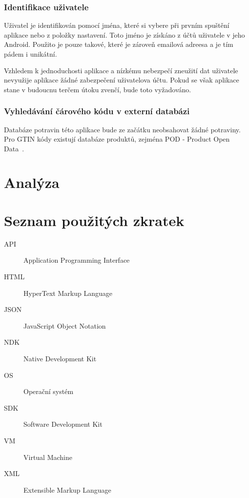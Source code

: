 \documentclass[thesis=B,czech]{FITthesis}[2013/10/20]
\begin{document}
\clearpage

\subsection{Identifikace uživatele}

Uživatel je identifikován pomocí jména, které si vybere při prvním spuštění aplikace nebo z položky nastavení. Toto jméno je získáno z účtů uživatele v jeho Android. Použito je pouze takové, které je zároveň emailová adreesa a je tím pádem i unikátní.

Vzhledem k jednoduchosti aplikace a nízkému nebezpečí zneužití dat uživatele nevyužije aplikace žádné zabezpečení uživatelova účtu. Pokud se však aplikace stane v budoucnu terčem útoku zvenčí, bude toto vyžadováno.

\subsection{Vyhledávání čárového kódu v externí databázi}

Databáze potravin této aplikace bude ze začátku neobsahovat žádné potraviny.
Pro GTIN kódy existují databáze produktů, zejména POD - Product Open Data~\cite{pod}.

\chapter{Analýza}

\begin{conclusion}
\end{conclusion}




\appendix

\chapter{Seznam použitých zkratek}
\begin{description}
	\item[API] Application Programming Interface
	\item[HTML] HyperText Markup Language
	\item[JSON] JavaScript Object Notation
	\item[NDK] Native Development Kit
	\item[OS] Operační systém
	\item[SDK] Software Development Kit
	\item[VM] Virtual Machine
	\item[XML] Extensible Markup Language
\end{description}
\end{document}
